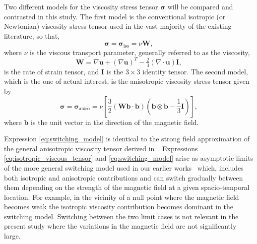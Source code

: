 \documentclass[fleqn,usenatbib]{mnras}
\newcommand{\ten}[1]{{\bm #1}}
\renewcommand{\vec}[1]{{\bm #1}}
\begin{document}
Two different models for the viscosity stress tensor $\ten{\sigma}$ will be
compared and contrasted in this study. The first model is the conventional
isotropic (or Newtonian) viscosity stress tensor used in the vast majority of
the existing literature, so that, 
\begin{equation}
  \label{eq:isotropic_viscous_tensor}
\ten{\sigma = }\ten{\sigma}_{\text{iso}} = \nu \ten{W},
\end{equation}
where $\nu$ is the viscous transport parameter, generally referred to as the
viscosity,
\begin{equation}
  \label{eq:rate_of_strain}
  \ten{W} = \nabla\vec{u} + (\nabla\vec{u})^T - \tfrac{2}{3}(\nabla \cdot \vec{u})\ten{I},
\end{equation}
is the rate of strain tensor, and $\ten{I}$ is the  $3\times 3$ identity
tensor. The second model, which is the one of actual interest, is the
anisotropic viscosity stress tensor given by
\begin{equation}
  \label{eq:switching_model}
\ten{\sigma} = \ten{\sigma}_\text{aniso} = \nu \left[\frac{3}{2}(\ten{W}\vec{b}\cdot\vec{b}) \left( \vec{b} \otimes \vec{b} - \frac{1}{3}\ten{I} \right)\right],
\end{equation}
where $\vec{b}$ is the unit vector in the direction of the magnetic
field.

Expression \eqref{eq:switching_model} is identical to the strong field
approximation of the general anisotropic viscosity tensor derived
in~\citet{braginskiiTransportProcessesPlasma1965}. Expressions
\eqref{eq:isotropic_viscous_tensor} and \eqref{eq:switching_model} arise as
asymptotic limits of the more general switching model used in our earlier works~\citep{mactaggartBraginskiiMagnetohydrodynamicsArbitrary2017,quinnEffectAnisotropicViscosity2020,quinnKelvinHelmholtzInstabilityCollapse2021}
which, includes both isotropic and anisotropic contributions and can switch
gradually between them depending on the strength of the magnetic field at
a given spacio-temporal location. For example, in the vicinity of a null point
where the magnetic field becomes weak the isotropic viscosity contribution
becomes dominant in the switching model. Switching between the two limit cases
is not relevant in the present study where the variations in the magnetic field
are not significantly large.
\end{document}
